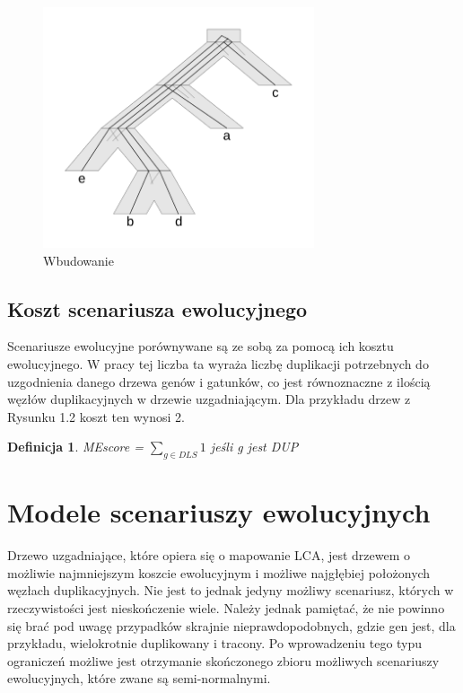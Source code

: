 \documentclass[licencjacka]{pracamgr}
\newtheorem{defi}{Definicja}[section]
\begin{document}
\begin{figure}[H]
  \centering
  \includegraphics[width=80mm]{./pictures/optscen.png}
  \caption{Wbudowanie}
\end{figure}

\subsection{Koszt scenariusza ewolucyjnego}

Scenariusze ewolucyjne porównywane są ze sobą za pomocą ich kosztu ewolucyjnego. W pracy tej liczba ta wyraża liczbę duplikacji potrzebnych do uzgodnienia danego drzewa genów i gatunków, co jest równoznaczne z ilością węzłów duplikacyjnych w drzewie uzgadniającym. Dla przykładu drzew z Rysunku 1.2 koszt ten wynosi 2.

\begin{defi}\label{ME}
  MEscore = $\sum_{g \in DLS} 1 $ jeśli g jest DUP 
\end{defi}



\section{Modele scenariuszy ewolucyjnych}

Drzewo uzgadniające, które opiera się o mapowanie LCA, jest drzewem o możliwie najmniejszym koszcie ewolucyjnym i możliwe najgłębiej położonych węzłach duplikacyjnych. Nie jest to jednak jedyny możliwy scenariusz, których w rzeczywistości jest nieskończenie wiele. Należy jednak pamiętać, że nie powinno się brać pod uwagę przypadków skrajnie nieprawdopodobnych, gdzie gen jest, dla przykładu, wielokrotnie duplikowany i tracony. Po wprowadzeniu tego typu ograniczeń możliwe jest otrzymanie skończonego zbioru możliwych scenariuszy ewolucyjnych, które zwane są semi-normalnymi. 
\end{document}
